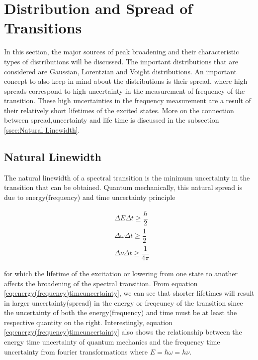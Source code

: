 \documentclass[a4paper]{book}
\begin{document}
\section{Distribution and Spread of Transitions}
\label{sec:DistandSpread}
In this section, the major sources of peak broadening and their characteristic types of distributions will be discussed. The important distributions that are considered are Gaussian, Lorentzian and Voight distributions. An important concept to also keep in mind about the distributions is their spread, where high spreads correspond to high uncertainty in the measurement of frequency of the transition. These high uncertainties in the frequency measurement are a result of their relatively short lifetimes of the excited states. More on the connection between spread,uncertainty and life time is discussed in the subsection \ref{ssec:Natural Linewidth}.

\subsection{Natural Linewidth}
\label{subsec:Natural Linewidth}
The natural linewidth of a spectral transition is the minimum uncertainty in the transition that can be obtained. Quantum mechanically, this natural spread is due to energy(frequency) and time uncertainty principle

\begin{equation}
\label{eq:energy(frequency)timeuncertainty}
\begin{split}
&\Delta E \Delta t \geq \dfrac{\hbar}{2} \\
&\Delta \omega \Delta t \geq \dfrac{1}{2} \\
&\Delta \nu \Delta t \geq \dfrac{1}{4 \pi}
\end{split}
\end{equation}

for which the lifetime of the excitation or lowering from one state to another affects the broadening of the spectral transition. From equation \ref{eq:energy(frequency)timeuncertainty}, we can see that shorter lifetimes will result in larger uncertainty(spread) in the energy or freqeuncy of the transition since the uncertainty of both the energy(frequency) and time must be at least the respective quantity on the right. Interestingly, equation \ref{eq:energy(frequency)timeuncertainty} also shows the relationship between the energy time uncertainty of quantum mechanics and the frequency time uncertainty from fourier transformations where $E=\hbar \omega =h \nu$. 
\end{document}
